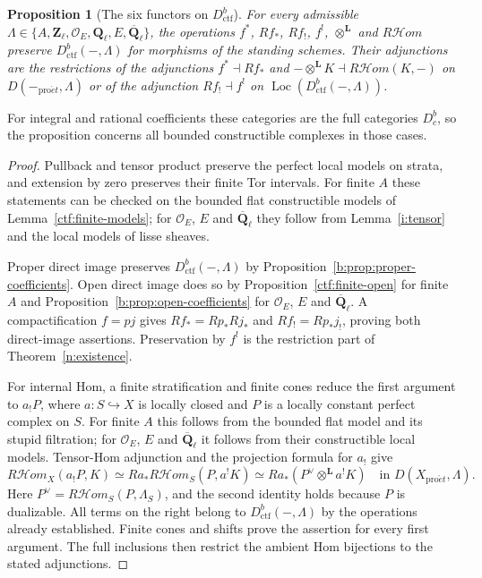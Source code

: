\documentclass[11pt,a4paper]{article}
\numberwithin{equation}{section}
\newtheorem{proposition}[theorem]{Proposition}
\theoremstyle{definition}
\theoremstyle{remark}
\newcommand{\Dbc}{D^b_c}
\newcommand{\cHom}{R\mathcal{H}\!om}
\newcommand{\Loc}{\operatorname{Loc}}
\newcommand{\Qbar}{\overline{\mathbf Q}_\ell}
\newcommand{\Ql}{\mathbf Q_\ell}
\newcommand{\Zl}{\mathbf Z_\ell}
\newcommand{\proet}{\mathrm{pro}\acute{e}t}
\newcommand{\Dctf}{D^b_{\mathrm{ctf}}}
\begin{document}
\begin{proposition}[The six functors on $\Dctf$]
\label{n:six-small}
For every admissible $\Lambda\in\{A,\Zl,\mathcal O_E,\Ql,E,\Qbar\}$, the
operations $f^*$, $Rf_*$, $Rf_!$, $f^!$, $\otimes^{\mathbf L}$ and
$\cHom$ preserve $\Dctf(-,\Lambda)$ for morphisms of the standing
schemes. Their adjunctions are the restrictions of the adjunctions
$f^*\dashv Rf_*$ and $-\otimes^{\mathbf L}K\dashv\cHom(K,-)$ on
$D(-_{\proet},\Lambda)$ or of the adjunction $Rf_!\dashv f^!$ on
$\Loc(\Dctf(-,\Lambda))$.
\end{proposition}

For integral and rational coefficients these categories are the full
categories $\Dbc$, so the proposition concerns all bounded constructible
complexes in those cases.
\begin{proof}
Pullback and tensor product preserve the perfect local models on
strata, and extension by zero preserves their finite Tor intervals.
For finite $A$ these statements can be checked on the bounded flat
constructible models of Lemma~\ref{ctf:finite-models}; for
$\mathcal O_E$, $E$ and $\Qbar$ they follow from Lemma~\ref{i:tensor} and
the local models of lisse sheaves.

Proper direct image preserves $\Dctf(-,\Lambda)$ by
Proposition~\ref{b:prop:proper-coefficients}. Open direct image does
so by Proposition~\ref{ctf:finite-open} for finite $A$ and
Proposition~\ref{b:prop:open-coefficients} for $\mathcal O_E$, $E$ and $\Qbar$.
A compactification $f=pj$ gives $Rf_*=Rp_*Rj_*$ and
$Rf_!=Rp_*j_!$, proving both direct-image assertions. Preservation
by $f^!$ is the restriction part of Theorem~\ref{n:existence}.

For internal Hom, a finite stratification and finite cones reduce the
first argument to $a_!P$, where $a:S\hookrightarrow X$ is locally
closed and $P$ is a locally constant perfect complex on $S$.
For finite $A$ this follows from the bounded flat model and its
stupid filtration; for $\mathcal O_E$, $E$ and $\Qbar$ it follows from
their constructible local models. Tensor-Hom adjunction and the projection formula for $a_!$ give
\[
 \cHom_X(a_!P,K)
   \simeq Ra_*\cHom_S(P,a^!K)
   \simeq Ra_*(P^\vee\otimes^{\mathbf L}a^!K)
   \quad\text{in }D(X_{\proet},\Lambda).
\]
Here $P^\vee=\cHom_S(P,\Lambda_S)$, and the second identity holds
because $P$ is dualizable. All terms on the right
belong to $\Dctf(-,\Lambda)$ by the operations already established.
Finite cones and shifts prove the assertion for every first argument.
The full inclusions then restrict the ambient Hom bijections to the
stated adjunctions.
\end{proof}
\end{document}
